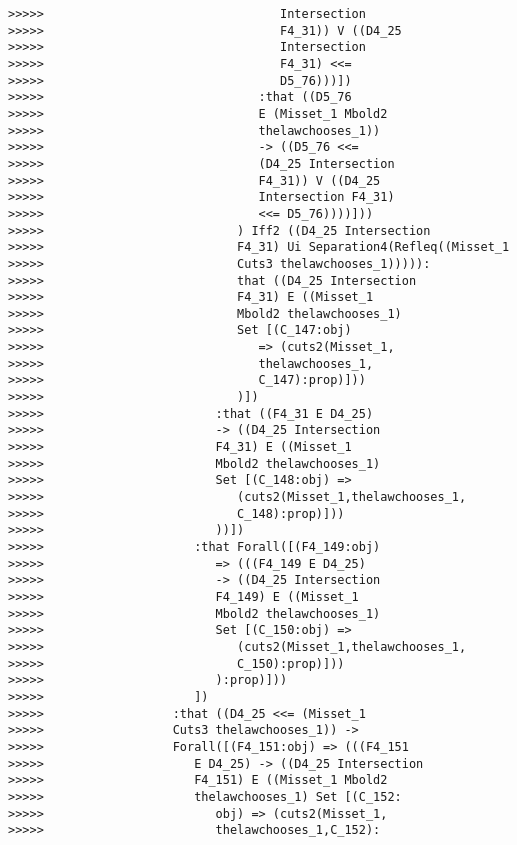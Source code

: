 \documentclass[12pt]{article}
\begin{document}
\begin{verbatim}
>>>>>                                 Intersection
>>>>>                                 F4_31)) V ((D4_25
>>>>>                                 Intersection
>>>>>                                 F4_31) <<=
>>>>>                                 D5_76)))])
>>>>>                              :that ((D5_76
>>>>>                              E (Misset_1 Mbold2
>>>>>                              thelawchooses_1))
>>>>>                              -> ((D5_76 <<=
>>>>>                              (D4_25 Intersection
>>>>>                              F4_31)) V ((D4_25
>>>>>                              Intersection F4_31)
>>>>>                              <<= D5_76))))]))
>>>>>                           ) Iff2 ((D4_25 Intersection
>>>>>                           F4_31) Ui Separation4(Refleq((Misset_1
>>>>>                           Cuts3 thelawchooses_1))))):
>>>>>                           that ((D4_25 Intersection
>>>>>                           F4_31) E ((Misset_1
>>>>>                           Mbold2 thelawchooses_1)
>>>>>                           Set [(C_147:obj)
>>>>>                              => (cuts2(Misset_1,
>>>>>                              thelawchooses_1,
>>>>>                              C_147):prop)]))
>>>>>                           )])
>>>>>                        :that ((F4_31 E D4_25)
>>>>>                        -> ((D4_25 Intersection
>>>>>                        F4_31) E ((Misset_1
>>>>>                        Mbold2 thelawchooses_1)
>>>>>                        Set [(C_148:obj) =>
>>>>>                           (cuts2(Misset_1,thelawchooses_1,
>>>>>                           C_148):prop)]))
>>>>>                        ))])
>>>>>                     :that Forall([(F4_149:obj)
>>>>>                        => (((F4_149 E D4_25)
>>>>>                        -> ((D4_25 Intersection
>>>>>                        F4_149) E ((Misset_1
>>>>>                        Mbold2 thelawchooses_1)
>>>>>                        Set [(C_150:obj) =>
>>>>>                           (cuts2(Misset_1,thelawchooses_1,
>>>>>                           C_150):prop)]))
>>>>>                        ):prop)]))
>>>>>                     ])
>>>>>                  :that ((D4_25 <<= (Misset_1
>>>>>                  Cuts3 thelawchooses_1)) ->
>>>>>                  Forall([(F4_151:obj) => (((F4_151
>>>>>                     E D4_25) -> ((D4_25 Intersection
>>>>>                     F4_151) E ((Misset_1 Mbold2
>>>>>                     thelawchooses_1) Set [(C_152:
>>>>>                        obj) => (cuts2(Misset_1,
>>>>>                        thelawchooses_1,C_152):

\end{verbatim}
\end{document}
